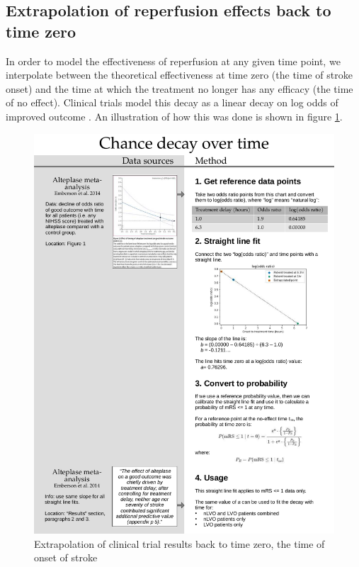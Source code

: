 \subsection{Extrapolation of reperfusion effects back to time zero}

In order to model the effectiveness of reperfusion at any given time point, we interpolate between the theoretical effectiveness at time zero (the time of stroke onset) and the time at which the treatment no longer has any efficacy (the time of no effect). Clinical trials model this decay as a linear decay on log odds of improved outcome \cite{emberson_effect_2014, fransen_time_2016}. An illustration of how this was done is shown in figure \ref{fig:decay}.

\begin{figure}[h!]
    \centering
    \includegraphics[width=1.0\linewidth]{images_modelling/data_sources_decay.png}
    \caption{Extrapolation of clinical trial results back to time zero, the time of onset of stroke}
    \label{fig:decay}
\end{figure}

